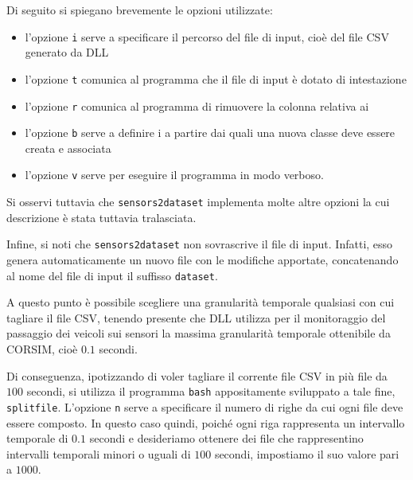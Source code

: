 \cleardoublepage
{}
Di seguito si spiegano brevemente le opzioni utilizzate:
\begin{itemize}
	\item l'opzione \lstinline[]|i| serve a specificare il percorso del file di input, cioè del file \acs{CSV} generato da  \acs{DLL}
	\item l'opzione \lstinline[]|t| comunica al programma che il file di input è dotato di intestazione
	\item l'opzione \lstinline[]|r| comunica al programma di rimuovere la colonna relativa ai \emph{}
	\item l'opzione \lstinline[]|b| serve a definire i \emph{} a partire dai quali una nuova classe deve essere creata e associata
	\item l'opzione \lstinline[]|v| serve per eseguire il programma in modo verboso.
\end{itemize}
Si osservi tuttavia che \lstinline[]|sensors2dataset| implementa molte altre opzioni la cui descrizione è stata tuttavia tralasciata.

Infine, si noti che \lstinline[]|sensors2dataset| non sovrascrive il file di input. Infatti, esso genera automaticamente un nuovo file con le modifiche apportate, concatenando al nome del file di input il suffisso \lstinline[]|dataset|.

A questo punto è possibile scegliere una granularità temporale qualsiasi con cui tagliare il file \acs{CSV}, tenendo presente che  \acs{DLL} utilizza per il monitoraggio del passaggio dei veicoli sui sensori la massima granularità temporale ottenibile da \acs{CORSIM}, cioè $0.1$ secondi.

Di conseguenza, ipotizzando di voler tagliare il corrente file \acs{CSV} in più file da $100$ secondi, si utilizza il programma \lstinline[]|bash| appositamente sviluppato a tale fine, \lstinline[]|splitfile|.
\vspace*{8pt}
L'opzione \lstinline[]|n| serve a specificare il numero di righe da cui ogni file deve essere composto. In questo caso quindi, poiché ogni riga rappresenta un intervallo temporale di $0.1$ secondi e desideriamo ottenere dei file che rappresentino intervalli temporali minori o uguali di $100$ secondi, impostiamo il suo valore pari a $1000$.

